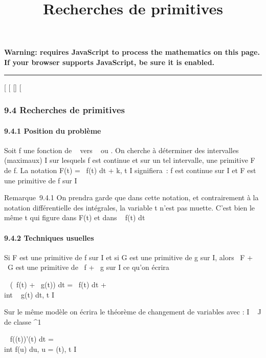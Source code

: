 \documentclass[]{article}
\title{Recherches de primitives}
\author{}
\date{}
\begin{document}
\maketitle

\textbf{Warning: 
requires JavaScript to process the mathematics on this page.\\ If your
browser supports JavaScript, be sure it is enabled.}

\begin{center}\rule{3in}{0.4pt}\end{center}

{[}
{[}
{[}{]}
{[}

\subsubsection{9.4 Recherches de primitives}

\paragraph{9.4.1 Position du problème}

Soit f une fonction de ~ vers ~ ou . On cherche à déterminer des
intervalles (maximaux) I sur lesquels f est continue et sur un tel
intervalle, une primitive F de f. La notation F(t)
=\int ~ f(t) dt + k, t \in I signifiera~: f est
continue sur I et F est une primitive de f sur I

Remarque~9.4.1 On prendra garde que dans cette notation, et
contrairement à la notation différentielle des intégrales, la variable t
n'est pas muette. C'est bien le même t qui figure dans F(t) et dans
\int ~ f(t) dt

\paragraph{9.4.2 Techniques usuelles}

Si F est une primitive de f sur I et si G est une primitive de g sur I,
alors \alpha~F + \beta~G est une primitive de \alpha~f + \beta~g sur I ce qu'on écrira

\int ~ (\alpha~f(t) + \beta~g(t)) dt =
\alpha~\int  f(t) dt + \beta~\\int ~
g(t) dt, t \in I

Sur le même modèle on écrira le théorème de changement de variables avec
\phi : I \rightarrow~ J de classe ^1

\int ~ f(\phi(t))\phi'(t) dt =\\int
 f(u) du, u = \phi(t), t \in I
\end{document}
